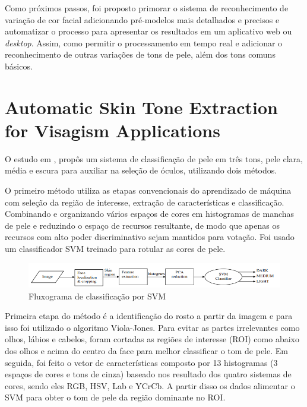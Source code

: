 Como próximos passos, foi proposto primorar o sistema de reconhecimento de variação de cor facial adicionando pré-modelos mais detalhados e precisos e automatizar o processo para apresentar os resultados em um aplicativo web ou \textit{desktop}. Assim, como permitir o processamento em tempo real e adicionar o reconhecimento de outras variações de tons de pele, além dos tons comuns básicos. 

\section{Automatic Skin Tone Extraction for Visagism Applications}
 O estudo em \cite{Automatic_Skin_Tone_Extraction_for_Visagism_Applications}, propôs um sistema de classificação de pele em três tons, pele clara, média e escura para auxiliar na seleção de óculos, utilizando dois métodos.
 
O primeiro método utiliza as etapas convencionais do aprendizado de máquina com seleção da região de interesse, extração de características e classificação. Combinando e organizando vários espaços de cores em histogramas de manchas de pele e reduzindo o espaço de recursos resultante, de modo que apenas os recursos com alto poder discriminativo sejam mantidos para votação. Foi usado um classificador SVM treinado para rotular as cores de pele.

\begin{figure}[h]
\caption{Fluxograma de classificação por SVM }
\centering

\includegraphics[]{Template_Latex_TCC-UNIFTEC/_lib/imagens/FluxogramaVisagismo.png}

\label{fig:x fluxogama_svm}
\end{figure}

Primeira etapa do método é a identificação do rosto a partir da imagem e para isso foi utilizado o algoritmo Viola-Jones. Para evitar as partes irrelevantes como olhos, lábios e cabelos, foram cortadas as regiões de interesse (ROI) como abaixo dos olhos e acima do centro da face para melhor classificar o tom de pele. Em seguida, foi feito o vetor de características composto por 13 histogramas (3 espaços de cores e tons de cinza) baseado nos resultado dos quatro sistemas de cores, sendo eles RGB, HSV, Lab e YCrCb. A partir disso os dados alimentar o SVM para obter o tom de pele da região dominante no ROI.

